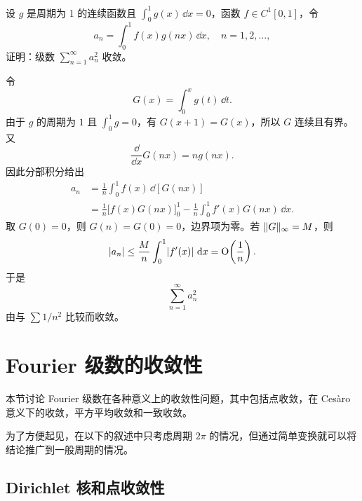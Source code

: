 \begin{xexercise}[8]
设 $g$ 是周期为 1 的连续函数且 $\int_0^1g(x)\,\dd x=0$，函数 $f\in C^1[0,1]$，令
  \[
    a_n=\int_0^1f(x)g(nx)\,\dd x,\quad n=1,2,\ldots,
  \]
  证明：级数 $\sum_{n=1}^{\infty}a_n^2$ 收敛。
\end{xexercise}
\begin{xsolution}
令
\[
  G(x)=\int_0^xg(t)\,\dd t.
\]
由于 $g$ 的周期为 $1$ 且 $\int_0^1g=0$，有 $G(x+1)=G(x)$，所以 $G$ 连续且有界。又
\[
  \frac{\dd}{\dd x}G(nx)=n g(nx).
\]
因此分部积分给出
\begin{align*}
  a_n
  &=\frac1n\int_0^1f(x)\,\dd[G(nx)]\\
  &=\frac1n\bigl[f(x)G(nx)\bigr]_0^1
    -\frac1n\int_0^1f'(x)G(nx)\,\dd x.
\end{align*}
取 $G(0)=0$，则 $G(n)=G(0)=0$，边界项为零。若
$\lVert G\rVert_\infty=M$，则
\[
  \lvert a_n\rvert\le\frac{M}{n}\int_0^1\lvert f'(x)\rvert\,\mathop{}\!\mathrm{d} x=\mathrm{O}\!\left(\frac1n\right).
\]
于是
\[
  \sum_{n=1}^{\infty}a_n^2
\]
由与 $\sum1/n^2$ 比较而收敛。
\end{xsolution}


\section{Fourier 级数的收敛性}

本节讨论 Fourier 级数在各种意义上的收敛性问题，其中包括点收敛，在 Cesàro 意义下的收敛，平方平均收敛和一致收敛。

为了方便起见，在以下的叙述中只考虑周期 $2\pi$ 的情况，但通过简单变换就可以将结论推广到一般周期的情况。

\subsection{Dirichlet 核和点收敛性}

